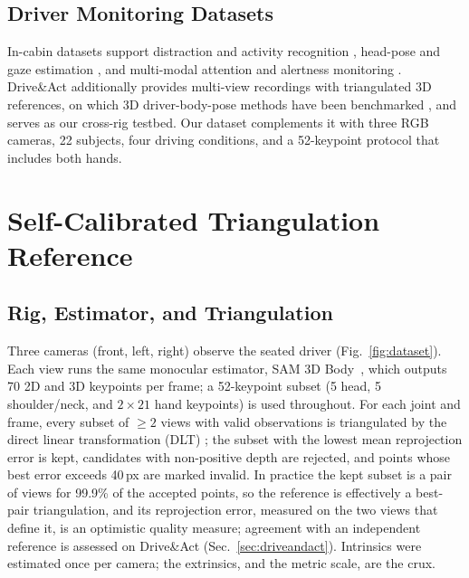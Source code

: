 \documentclass[journal]{IEEEtran}
\newcommand{\da}{Drive\&Act}
\begin{document}
\subsection{Driver Monitoring Datasets}
In-cabin datasets support distraction and activity recognition \cite{abouelnaga2017real,zhang2018driver,gorelik2026multiview}, head-pose and gaze estimation \cite{roth2019ddpose,selim2020autopose}, and multi-modal attention and alertness monitoring \cite{ortega2020dmd}. \da{} \cite{martin2019drive} additionally provides multi-view recordings with triangulated 3D references, on which 3D driver-body-pose methods have been benchmarked \cite{martin2021evaluation}, and serves as our cross-rig testbed. Our dataset complements it with three RGB cameras, 22 subjects, four driving conditions, and a 52-keypoint protocol that includes both hands.

\section{Self-Calibrated Triangulation Reference}
\label{sec:reference}

\subsection{Rig, Estimator, and Triangulation}
Three cameras (front, left, right) observe the seated driver (Fig.~\ref{fig:dataset}). Each view runs the same monocular estimator, SAM 3D Body~\cite{yang2026sam3dbody}, which outputs 70 2D and 3D keypoints per frame; a 52-keypoint subset (5 head, 5 shoulder/neck, and $2\times21$ hand keypoints) is used throughout. For each joint and frame, every subset of $\geq2$ views with valid observations is triangulated by the direct linear transformation (DLT) \cite{hartley1997triangulation}; the subset with the lowest mean reprojection error is kept, candidates with non-positive depth are rejected, and points whose best error exceeds 40\,px are marked invalid. In practice the kept subset is a pair of views for 99.9\% of the accepted points, so the reference is effectively a best-pair triangulation, and its reprojection error, measured on the two views that define it, is an optimistic quality measure; agreement with an independent reference is assessed on \da{} (Sec.~\ref{sec:driveandact}). Intrinsics were estimated once per camera; the extrinsics, and the metric scale, are the crux.
\end{document}
